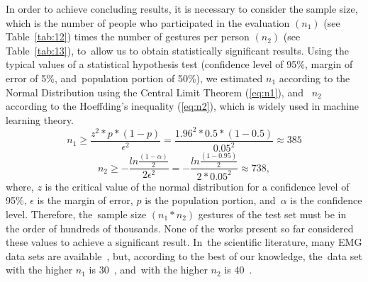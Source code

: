 \documentclass[sensors,review,accept,moreauthors,pdftex]{Definitions/mdpi}
\begin{document}
In order to achieve concluding results, it is necessary to consider the sample size, which is the number of people who participated in the evaluation
\begin{math}
(n_{1})
\end{math} (see Table~\ref{tab:12}) times the number of gestures per person
\begin{math}
(n_{2})
\end{math} (see Table~\ref{tab:13}), to~allow us to obtain statistically significant results. Using the typical values of a statistical hypothesis test (confidence level of 95\%, margin of error of 5\%, and~population portion of 50\%), we estimated 
\begin{math}
n_{1}
\end{math} according to the Normal Distribution using the Central Limit Theorem (\ref{eq:n1}), and~ 
\begin{math}
n_{2}
\end{math} according to the Hoeffding's inequality (\ref{eq:n2}), which is widely used in machine learning theory.\newpage
\begin{equation} \label{eq:n1}
n_{1}\geq\frac{z^{2}*p*(1-p)}{\epsilon^{2}}=\frac{1.96^{2}*0.5*(1-0.5)}{0.05^{2}}\approx 385
\end{equation}
\begin{equation} \label{eq:n2}
n_{2}\geq-\frac{ln\frac{(1-\alpha)}{2}}{2\epsilon^{2}}=-\frac{ln\frac{(1-0.95)}{2}}{2*0.05^{2}}\approx 738,
\end{equation}
where, 
\begin{math}
z
\end{math} is the critical value of the normal distribution for a confidence level of 95\%, 
\begin{math}
\epsilon
\end{math} is the margin of error,
\begin{math}
p
\end{math} is the population portion, and~\begin{math}
\alpha
\end{math} is the confidence level. Therefore, the~sample size
\begin{math}
(n_{1}*n_{2})
\end{math} gestures of the test set must be in the order of hundreds of thousands. None of the works present so far considered these values to achieve a significant result. In~the scientific literature, many EMG data sets are available~\cite{phinyomark2018emg}, but, according to the best of our knowledge, the~data set with the higher 
\begin{math}
n_{1}
\end{math} is 30~\cite{sapsanis2013improving}, and~with the higher  
\begin{math}
n_{2}
\end{math} is 40~\cite{cote2019deep,atzori2014electromyography}.
\end{document}
